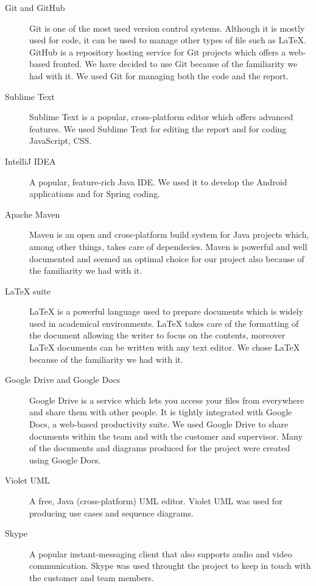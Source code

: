 \begin{description}

\item[Git and GitHub]
Git is one of the most used version control systems. Although it is mostly used for code, it can be used to manage other types of file such as LaTeX. GitHub is a repository hosting service for Git projects which offers a web-based fronted. We have decided to use Git because of the familiarity we had with it. We used Git for managing both the code and the report.

\item[Sublime Text]
Sublime Text is a popular, cross-platform editor which offers advanced features.
We used Sublime Text for editing the report and for coding JavaScript, CSS.

\item[IntelliJ IDEA]
A popular, feature-rich Java IDE. We used it to develop the Android applications and for Spring coding.

\item[Apache Maven]
Maven is an open and cross-platform build system for Java projects which, among other things, takes care of dependecies. Maven is powerful and well documented and seemed an optimal choice for our project also because of the familiarity we had with it.

\item[LaTeX suite]
LaTeX is a powerful language used to prepare documents which is widely used in academical environments. LaTeX takes care of the formatting of the document allowing the writer to focus on the contents, moreover LaTeX documents can be written with any text editor.
We chose LaTeX because of the familiarity we had with it.

\item[Google Drive and Google Docs]
Google Drive is a service which lets you access your files from everywhere and share them with other people. It is tightly integrated with Google Docs, a web-based productivity suite. We used Google Drive to share documents within the team and with the customer and supervisor.
Many of the documents and diagrams produced for the project were created using Google Docs.

\item[Violet UML]
A free, Java (cross-platform) UML editor. Violet UML was used for producing use cases and sequence diagrams.

\item[Skype]
A popular instant-messaging client that also supports audio and video communication.
Skype was used throught the project to keep in touch with the customer and team members.


\end{description}
